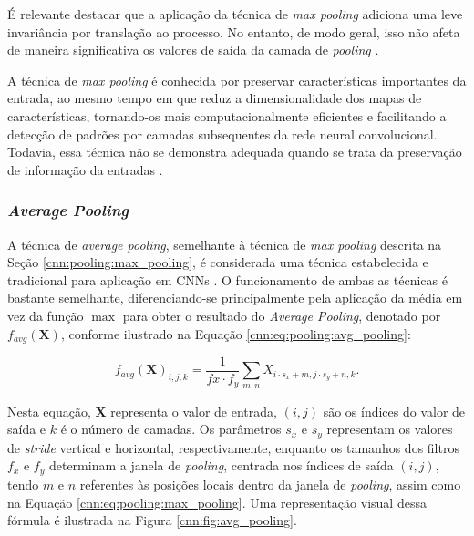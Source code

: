 É relevante destacar que a aplicação da técnica de \textit{max pooling} adiciona uma leve invariância por translação ao processo. No entanto, de modo geral, isso não afeta de maneira significativa os valores de saída da camada de \textit{pooling} \citep{Boureau2010ARecognition}.

A técnica de \textit{max pooling} é conhecida por preservar características importantes da entrada, ao mesmo tempo em que reduz a dimensionalidade dos mapas de características, tornando-os mais computacionalmente eficientes e facilitando a detecção de padrões por camadas subsequentes da rede neural convolucional. Todavia, essa técnica não se demonstra adequada quando se trata da preservação de informação da entradas \citep{Liu2019Multi-LevelNetworks}.

\subsubsection{\textit{Average Pooling}}
\label{cnn:pooling:avg_pooling}
A técnica de \textit{average pooling}, semelhante à técnica de \textit{max pooling} descrita na Seção \ref{cnn:pooling:max_pooling}, é considerada uma técnica estabelecida e tradicional para aplicação em CNNs \citep{Zafar2022ANetworks, Paul2019DimensionalityPooling}. O funcionamento de ambas as técnicas é bastante semelhante, diferenciando-se principalmente pela aplicação da média em vez da função $\max$ para obter o resultado do \textit{Average Pooling}, denotado por $f_{avg}(\boldsymbol{X})$, conforme ilustrado na Equação \ref{cnn:eq:pooling:avg_pooling}:

\begin{equation}
    \label{cnn:eq:pooling:avg_pooling}
    f_{avg}(\boldsymbol{X})_{i, j, k} = \frac{1}{f{x} \cdot f_{y}} \sum_{m, n} X_{i \cdot s_x + m, j \cdot s_{y} + n, k}.
\end{equation}

Nesta equação, $\boldsymbol{X}$ representa o valor de entrada, $(i, j)$ são os índices do valor de saída e $k$ é o número de camadas. Os parâmetros $s_x$ e $s_y$ representam os valores de \textit{stride} vertical e horizontal, respectivamente, enquanto os tamanhos dos filtros $f_x$ e $f_y$ determinam a janela de \textit{pooling}, centrada nos índices de saída $(i,j)$, tendo $m$ e $n$ referentes às posições locais dentro da janela de \textit{pooling}, assim como na Equação \ref{cnn:eq:pooling:max_pooling}. Uma representação visual dessa fórmula é ilustrada na Figura \ref{cnn:fig:avg_pooling}.

